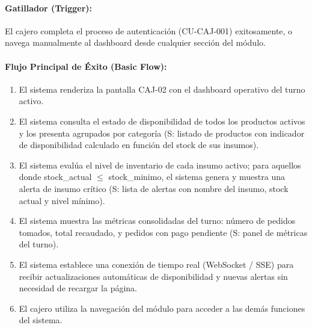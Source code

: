 \paragraph{Gatillador (Trigger):} El cajero completa el proceso de autenticación (CU-CAJ-001) exitosamente, o navega manualmente al dashboard desde cualquier sección del módulo.

\paragraph{Flujo Principal de Éxito (Basic Flow):}
\begin{enumerate}
    \item[I.] El sistema renderiza la pantalla CAJ-02 con el dashboard operativo del turno activo.
    \item[II.] El sistema consulta el estado de disponibilidad de todos los productos activos y los presenta agrupados por categoría (S: listado de productos con indicador de disponibilidad calculado en función del stock de sus insumos).
    \item[III.] El sistema evalúa el nivel de inventario de cada insumo activo; para aquellos donde stock\_actual $\le$ stock\_minimo, el sistema genera y muestra una alerta de insumo crítico (S: lista de alertas con nombre del insumo, stock actual y nivel mínimo).
    \item[IV.] El sistema muestra las métricas consolidadas del turno: número de pedidos tomados, total recaudado, y pedidos con pago pendiente (S: panel de métricas del turno).
    \item[V.] El sistema establece una conexión de tiempo real (WebSocket / SSE) para recibir actualizaciones automáticas de disponibilidad y nuevas alertas sin necesidad de recargar la página.
    \item[VI.] El cajero utiliza la navegación del módulo para acceder a las demás funciones del sistema.
\end{enumerate}


